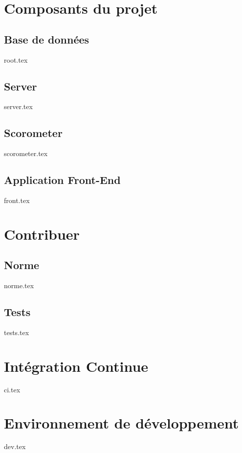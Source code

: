 \documentclass[a4paper, 12pt]{article}
\def\dir{tech_documentation}
\begin{document}
\section{Composants du projet}

\subsection{Base de données}
{root.tex}

\subsection{Server}
{server.tex}

\subsection{Scorometer}
{scorometer.tex}

\subsection{Application Front-End}
{front.tex}

\section{Contribuer}
\subsection{Norme}
{norme.tex}
\subsection{Tests}
{tests.tex}

\section{Intégration Continue}
{ci.tex}

\section{Environnement de développement}
{dev.tex}
\end{document}
